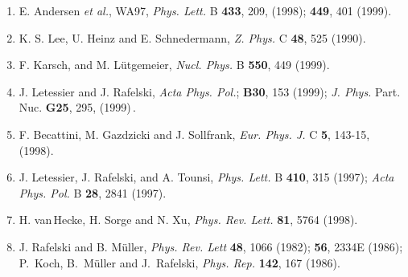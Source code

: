 \begin{mdframed}[linecolor=gray,roundcorner=12pt,backgroundcolor=Dandelion!15,linewidth=1pt,leftmargin=0cm,rightmargin=0cm,topline=true,bottomline=true,skipabove=12pt]
{\begin{enumerate}
\item%
E. Andersen {\it et al.}, WA97,
{\it Phys. Lett.} B {\bf 433}, 209, (1998);
{\bf 449}, 401 (1999).


\item%
K. S. Lee, U. Heinz and E. Schnedermann, 
{\it Z. Phys.} C {\bf 48}, 525 (1990). %

\item%
F. Karsch, and M. L\"utgemeier, 
{\it Nucl. Phys.} B {\bf 550}, 449 (1999).


\item%
J. Letessier and J. Rafelski, {\it Acta Phys. Pol.};
{\bf B30}, 153 (1999);
{\it J. Phys.} Part. Nuc. {\bf G25}, 295, (1999)\,.

\item%
 F. Becattini, M. Gazdzicki and J. Sollfrank,
{\it Eur. Phys. J.} C {\bf 5}, 143-15, (1998). 

\item%
J. Letessier, J. Rafelski, and A. Tounsi, 
{\it Phys. Lett.} B {\bf 410}, 315 (1997);
{\it Acta Phys. Pol.} B {\bf 28}, 2841 (1997).

\item%
H. van\,Hecke, H. Sorge and N. Xu,
{\it Phys. Rev. Lett.} {\bf 81}, 5764 (1998).

\item%
{J. Rafelski and B. M\"uller}, {\it Phys. Rev. Lett}
{\bf 48}, 1066 (1982); {\bf 56}, 2334E (1986);
{P.~Koch, B.~M\"uller and J.~Rafelski},
{\it Phys. Rep.} {\bf 142}, 167 (1986).


\end{enumerate}}
\end{mdframed}
